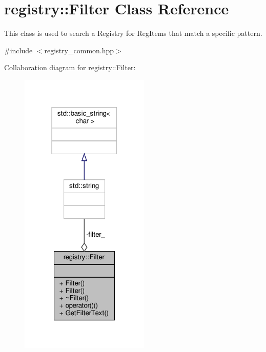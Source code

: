 \hypertarget{classregistry_1_1Filter}{}\section{registry\+:\+:Filter Class Reference}
\label{classregistry_1_1Filter}


This class is used to search a Registry for Reg\+Items that match a specific pattern.  




{\ttfamily \#include $<$registry\+\_\+common.\+hpp$>$}



Collaboration diagram for registry\+:\+:Filter\+:\nopagebreak
\begin{figure}[H]
\begin{center}
\leavevmode
\includegraphics[width=175pt]{classregistry_1_1Filter__coll__graph}
\end{center}
\end{figure}
